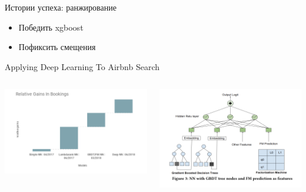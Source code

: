 \documentclass[11pt,aspectratio=169]{beamer}
\begin{document}
\begin{frame}{Истории успеха: ранжирование}

\begin{tcolorbox}[colback=info!5,colframe=info!80,title=Как оставить след в науке]
\begin{itemize}
\item Победить xgboost
\item Пофиксить смещения
\end{itemize}
\end{tcolorbox}

\end{frame}

\begin{frame}{Applying Deep Learning To Airbnb Search \cite{AIRBNB}}

\begin{columns}
\begin{column}{0.45\textwidth} 
\begin{center}
\includegraphics[scale=0.3]{images/airbnb-progression.png}
\end{center}
\end{column}
\begin{column}{0.45\textwidth}
\begin{center}
\includegraphics[scale=0.3]{images/airbnb-gbdt.png}
\end{center}
\end{column}
\end{columns}


\end{frame}
\end{document}
